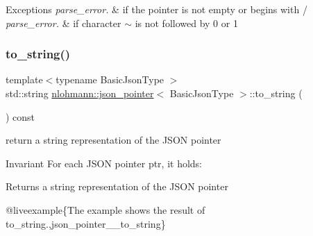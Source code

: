 \begin{DoxyExceptions}{Exceptions}
{\em parse\+\_\+error.} & if the pointer is not empty or begins with \textquotesingle{}/\textquotesingle{} \\
\hline
{\em parse\+\_\+error.} & if character \textquotesingle{}$\sim$\textquotesingle{} is not followed by \textquotesingle{}0\textquotesingle{} or \textquotesingle{}1\textquotesingle{} \\
\hline
\end{DoxyExceptions}
\mbox{\label{classnlohmann_1_1json__pointer_a3d4b15d32d096e3776c5d2c773b524f5}} 
\subsubsection{\texorpdfstring{to\_string()}{to\_string()}}
{\footnotesize\ttfamily template$<$typename Basic\+Json\+Type $>$ \\
std\+::string \mbox{\hyperlink{classnlohmann_1_1json__pointer}{nlohmann\+::json\+\_\+pointer}}$<$ Basic\+Json\+Type $>$\+::to\+\_\+string (\begin{DoxyParamCaption}{ }\end{DoxyParamCaption}) const\hspace{0.3cm}{\ttfamily [inline]}}



return a string representation of the J\+S\+ON pointer 

\begin{DoxyInvariant}{Invariant}
For each J\+S\+ON pointer {\ttfamily ptr}, it holds\+: 
\begin{DoxyCode}{0}
\end{DoxyCode}

\end{DoxyInvariant}
\begin{DoxyReturn}{Returns}
a string representation of the J\+S\+ON pointer
\end{DoxyReturn}
@liveexample\{The example shows the result of {\ttfamily to\+\_\+string}.,json\+\_\+pointer\+\_\+\+\_\+to\+\_\+string\}

